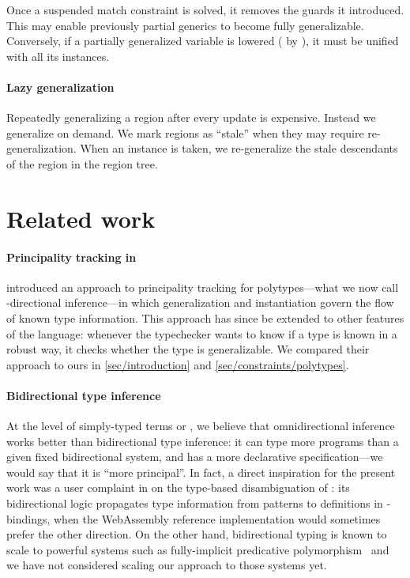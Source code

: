 \documentclass[acmsmall,screen,nonacm,review]{acmart}
\begin{document}
Once a suspended match constraint is solved, it removes the guards it
introduced. This may enable previously partial generics to become fully
generalizable. Conversely, if a partially generalized variable is lowered (\eg
by ), it must be unified with all its instances.

\paragraph{Lazy generalization} Repeatedly generalizing a region after every
update is expensive.  Instead we generalize on demand. We mark regions as
``stale'' when they may require re-generalization. When an instance is taken,
we re-generalize the stale descendants of the region in the region tree.

\section{Related work}
\label{sec:related-work}

\paragraph{Principality tracking in \OCaml}

\citet*{Garrigue-Remy/poly-ml} introduced an approach to principality tracking
for polytypes---what we now call \geninst-directional inference---in which
generalization and instantiation govern the flow of known type information.
This approach has since be extended to other features of the \OCaml language:
whenever the typechecker wants to know if a type is known in a robust way, it
checks whether the type is generalizable. We compared their approach to ours in
\cref{sec/introduction} and \cref{sec/constraints/polytypes}.

\paragraph{Bidirectional type inference}

At the level of simply-typed
terms or \ML, we believe that omnidirectional inference works better
than bidirectional type inference: it can type more programs than
a given fixed bidirectional system, and has a more declarative
specification---we would say that it is ``more principal''.  In fact,
a direct inspiration for the present work was a user complaint in
\citet*{rossberg-wasm} on the type-based disambiguation of \OCaml: its
bidirectional logic propagates type information from patterns to
definitions in -bindings, when the WebAssembly reference
implementation would sometimes prefer the other direction.
%
%
On the other hand, bidirectional typing is known to scale to powerful
systems such as fully-implicit predicative
polymorphism~\citep*{dunfield-krishnaswami-bidirectional-poly} and we
have not considered scaling our approach to those systems yet.
\end{document}
